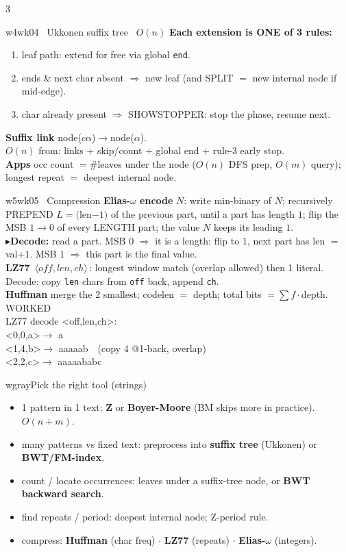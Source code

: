 \documentclass[9pt]{extarticle}
\newcommand{\To}{\ensuremath{\Rightarrow}}
\newcommand{\C}[1]{\texttt{#1}}
\newcommand{\key}[1]{\colorbox{hl}{\ensuremath{\,#1\,}}}     %
\newcommand{\T}[1]{\textbf{#1}\;}                            %
\newcommand{\R}{\textcolor{red!75!black}{$\blacktriangleright$}\;}  %
\newcommand{\ex}{\textcolor{black!55}{\scriptsize\textsf{WORKED}}\\[1pt]} %
\begin{document}
\begin{multicols}{3}
\begin{wk}{w4}{wk04 \ Ukkonen suffix tree \ $O(n)$}
\textbf{Each extension is ONE of 3 rules:}
\begin{enumerate}
\item leaf path: extend for free via global \C{end}.
\item ends \& next char absent \To{} new leaf (and SPLIT $=$ new internal node if mid-edge).
\item char already present \To{} SHOWSTOPPER: stop the phase, resume next.
\end{enumerate}
\textbf{Suffix link} node($c\alpha$)$\to$node($\alpha$).\\
$O(n)$ from: links $+$ skip/count $+$ global end $+$ rule-3 early stop.\\
\T{Apps} occ count $=\#$leaves under the node ($O(n)$ DFS prep, $O(m)$ query); longest repeat $=$ deepest internal node.
\end{wk}

\begin{wk}{w5}{wk05 \ Compression}
\textbf{Elias-$\omega$ encode} $N$: write min-binary of $N$; recursively PREPEND $L{=}($len$-1)$ of the previous part, until a part has length $1$; flip the MSB $1{\to}0$ of every LENGTH part; the value $N$ keeps its leading $1$.\\[1pt]
\R \textbf{Decode:} read a part. MSB $0$ \To{} it is a length: flip to $1$, next part has len $=$ val$+1$. MSB $1$ \To{} this part is the final value.\\[1pt]
\textbf{LZ77} \key{\langle off,len,ch\rangle}: longest window match (overlap allowed) then 1 literal. Decode: copy \C{len} chars from \C{off} back, append \C{ch}.\\[1pt]
\textbf{Huffman} merge the 2 smallest; codelen $=$ depth; total bits $=\sum f\cdot$depth.
\tcblower
\ex
\ttfamily
LZ77 decode \textless off,len,ch\textgreater:\\
\textless0,0,a\textgreater $\to$ a\\
\textless1,4,b\textgreater $\to$ aaaaab\ \ (copy 4 @1-back, overlap)\\
\textless2,2,c\textgreater $\to$ aaaaababc
\end{wk}

\begin{wk}{wgray}{Pick the right tool (strings)}
\begin{itemize}
\item 1 pattern in 1 text: \textbf{Z} or \textbf{Boyer-Moore} (BM skips more in practice). $O(n{+}m)$.
\item many patterns vs fixed text: preprocess into \textbf{suffix tree} (Ukkonen) or \textbf{BWT/FM-index}.
\item count / locate occurrences: leaves under a suffix-tree node, or \textbf{BWT backward search}.
\item find repeats / period: deepest internal node; Z-period rule.
\item compress: \textbf{Huffman} (char freq) $\cdot$ \textbf{LZ77} (repeats) $\cdot$ \textbf{Elias-$\omega$} (integers).
\end{itemize}
\end{wk}


\end{multicols}
\end{document}
